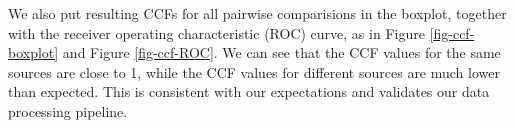 \documentclass[fleqn,10pt]{wlscirep}
\begin{document}
We also put resulting CCFs for all pairwise comparisions in the boxplot,
together with the receiver operating characteristic (ROC) curve, as in
Figure \ref{fig-ccf-boxplot} and Figure \ref{fig-ccf-ROC}. We can see
that the CCF values for the same sources are close to 1, while the CCF
values for different sources are much lower than expected. This is
consistent with our expectations and validates our data processing
pipeline.

\begin{figure}

\begin{minipage}{0.50\linewidth}


\subcaption{\label{fig-T1AW-LI-R1}}

\end{minipage}%
%
\begin{minipage}{0.50\linewidth}


\subcaption{\label{fig-T2AW-LI-R1}}

\end{minipage}%
\newline
\begin{minipage}{0.05\linewidth}
~\end{minipage}%
%
\begin{minipage}{0.90\linewidth}


\end{minipage}
\end{figure}
\end{document}
